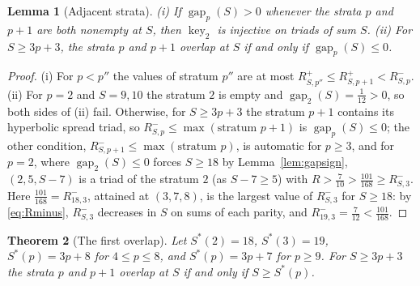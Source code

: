 \documentclass[pdflatex,sn-mathphys-num]{sn-jnl}
\theoremstyle{thmstyleone}%
\newtheorem{theorem}{Theorem}[section]%
\newtheorem{lemma}[theorem]{Lemma}%
\theoremstyle{thmstylethree}%
\newcommand{\keytwo}{\operatorname{key}_2}
\newcommand{\gap}{\operatorname{gap}}
\begin{document}
\begin{lemma}[Adjacent strata]\label{lem:adjacent}
(i) If $\gap_p(S)>0$ whenever the strata $p$ and $p+1$ are both nonempty at $S$, then $\keytwo$ is injective on triads of sum $S$. (ii) For $S\ge3p+3$, the strata $p$ and $p+1$ overlap at $S$ if and only if $\gap_p(S)\le0$.
\end{lemma}

\begin{proof}
(i) For $p<p''$ the values of stratum $p''$ are at most $R^+_{S,p''}\le R^+_{S,p+1}<R^-_{S,p}$. (ii) For $p=2$ and $S=9,10$ the stratum $2$ is empty and $\gap_2(S)=\frac1{12}>0$, so both sides of (ii) fail. Otherwise, for $S\ge3p+3$ the stratum $p+1$ contains its hyperbolic spread triad, so $R^-_{S,p}\le\max(\text{stratum }p+1)$ is $\gap_p(S)\le0$; the other condition, $R^-_{S,p+1}\le\max(\text{stratum }p)$, is automatic for $p\ge3$, and for $p=2$, where $\gap_2(S)\le0$ forces $S\ge18$ by Lemma~\ref{lem:gapsign}, $(2,5,S-7)$ is a triad of the stratum $2$ (as $S-7\ge5$) with $R>\frac7{10}>\frac{101}{168}\ge R^-_{S,3}$. Here $\frac{101}{168}=R^-_{18,3}$, attained at $(3,7,8)$, is the largest value of $R^-_{S,3}$ for $S\ge18$: by \eqref{eq:Rminus}, $R^-_{S,3}$ decreases in $S$ on sums of each parity, and $R^-_{19,3}=\frac7{12}<\frac{101}{168}$.
\end{proof}

\begin{theorem}[The first overlap]\label{thm:Sstar}
Let $S^*(2)=18$, $S^*(3)=19$, $S^*(p)=3p+8$ for $4\le p\le8$, and $S^*(p)=3p+7$ for $p\ge9$. For $S\ge3p+3$ the strata $p$ and $p+1$ overlap at $S$ if and only if $S\ge S^*(p)$.
\end{theorem}
\end{document}
